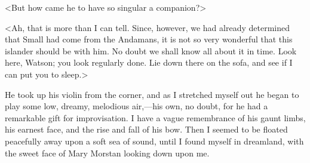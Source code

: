 <But how came he to have so singular a companion?>

<Ah, that is more than I can tell. Since, however, we had already determined that Small had come from the Andamans, it is not so very wonderful that this islander should be with him. No doubt we shall know all about it in time. Look here, Watson; you look regularly done. Lie down there on the sofa, and see if I can put you to sleep.>

He took up his violin from the corner, and as I stretched myself out he began to play some low, dreamy, melodious air,—his own, no doubt, for he had a remarkable gift for improvisation. I have a vague remembrance of his gaunt limbs, his earnest face, and the rise and fall of his bow. Then I seemed to be floated peacefully away upon a soft sea of sound, until I found myself in dreamland, with the sweet face of Mary Morstan looking down upon me.

